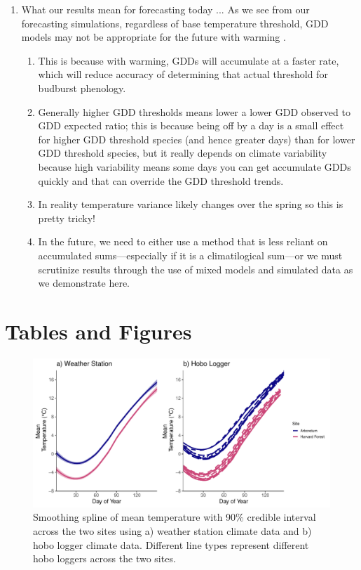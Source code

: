 \documentclass{article}\usepackage[]{graphicx}\usepackage[]{color}
\begin{document}
\begin{enumerate}
\begin{enumerate}
  \item What our results mean for forecasting today ... As we see from our forecasting simulations, regardless of base temperature threshold, GDD models may not be appropriate for the future with warming \citep{Man2010}. 
  \begin{enumerate} 
    \item This is because with warming, GDDs will accumulate at a faster rate, which will reduce accuracy of determining that actual threshold for budburst phenology. 
  \item Generally higher GDD thresholds means lower a lower GDD observed to GDD expected ratio; this is because being off by a day is a small effect for higher GDD threshold species (and hence greater days) than for lower GDD threshold species, but it really depends on climate variability because high variability means some days you can get accumulate GDDs quickly and that can override the GDD threshold trends. 
  \item In reality temperature variance likely changes over the spring so this is pretty tricky! 
  \item In the future, we need to either use a method that is less reliant on accumulated sums---especially if it is a climatilogical sum---or we must scrutinize results through the use of mixed models and simulated data as we demonstrate here.
  \end{enumerate}
\end{enumerate}





\section*{Tables and Figures}

{\begin{figure} [H]
  \begin{center}
  \includegraphics[width=12cm]{..//analyses/figures/climate_hfandts.pdf}
  \caption{Smoothing spline of mean temperature with 90\% credible interval across the two sites using a) weather station climate data and b) hobo logger climate data. Different line types represent different hobo loggers across the two sites.}\label{fig:clim}
  \end{center}
  \end{figure}}
  

\end{enumerate}
\end{document}
